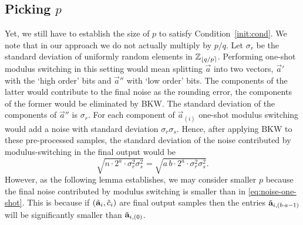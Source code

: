\subsection{Picking $p$}\label{pickp}
Yet, we still have to establish the size of $p$ to satisfy Condition~\ref{init:cond}. We note that in our approach we do not actually multiply by $p/q$. Let $\sigma_r$ be the standard deviation of uniformly random elements in $\mathbb{Z}_{\left\lfloor{q/p}\right\rceil}$. Performing one-shot modulus switching in this setting would mean splitting $\vec{a}$ 
into two vectors, $\vec{a}'$ with the `high order' bits and $\vec{a}''$ with `low order' bits. The components of the latter would contribute to the final noise as the rounding error, the components of the former would be eliminated by BKW. The standard deviation of the components of $\vec{a}''$ is $\sigma_r$. For each component of $\vec{a}_{(i)}$ one-shot modulus switching would add a noise with standard deviation $\sigma_r\sigma_s$. Hence, after applying BKW to these pre-processed samples, the standard deviation of the noise contributed by modulus-switching in the final output would be
\begin{equation}
\label{eq:noise-one-shot}
\sqrt{n \cdot 2^a \cdot \sigma_r^2\sigma_s^2} = \sqrt{a\,b \cdot 2^{a} \cdot \sigma_r^2 \sigma_s^2}. 
\end{equation}
However, as the following lemma establishes, we may consider smaller $p$ because the final noise contributed by modulus switching  is smaller than in \eqref{eq:noise-one-shot}. This is because if $(\tilde{\mathbf{a}}_i,\tilde c_i)$ are final output samples then the entries $\tilde{\mathbf{a}}_{i,(b\cdot a-1)}$ will be significantly smaller than $\tilde{\mathbf{a}}_{i,(0)}$.


